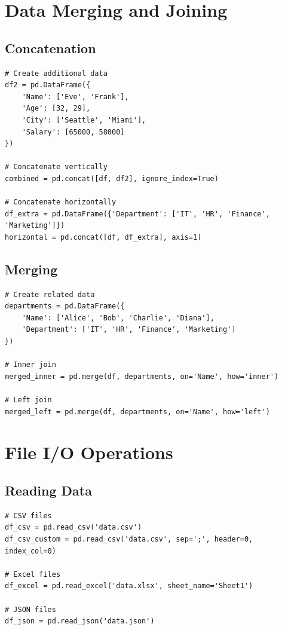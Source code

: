 \documentclass[12pt,a4paper]{article}
\begin{document}
\section{Data Merging and Joining}

\subsection{Concatenation}

\begin{lstlisting}
# Create additional data
df2 = pd.DataFrame({
    'Name': ['Eve', 'Frank'],
    'Age': [32, 29],
    'City': ['Seattle', 'Miami'],
    'Salary': [65000, 58000]
})

# Concatenate vertically
combined = pd.concat([df, df2], ignore_index=True)

# Concatenate horizontally
df_extra = pd.DataFrame({'Department': ['IT', 'HR', 'Finance', 'Marketing']})
horizontal = pd.concat([df, df_extra], axis=1)
\end{lstlisting}

\subsection{Merging}

\begin{lstlisting}
# Create related data
departments = pd.DataFrame({
    'Name': ['Alice', 'Bob', 'Charlie', 'Diana'],
    'Department': ['IT', 'HR', 'Finance', 'Marketing']
})

# Inner join
merged_inner = pd.merge(df, departments, on='Name', how='inner')

# Left join
merged_left = pd.merge(df, departments, on='Name', how='left')
\end{lstlisting}

\section{File I/O Operations}

\subsection{Reading Data}

\begin{lstlisting}
# CSV files
df_csv = pd.read_csv('data.csv')
df_csv_custom = pd.read_csv('data.csv', sep=';', header=0, index_col=0)

# Excel files
df_excel = pd.read_excel('data.xlsx', sheet_name='Sheet1')

# JSON files
df_json = pd.read_json('data.json')
\end{lstlisting}
\end{document}
